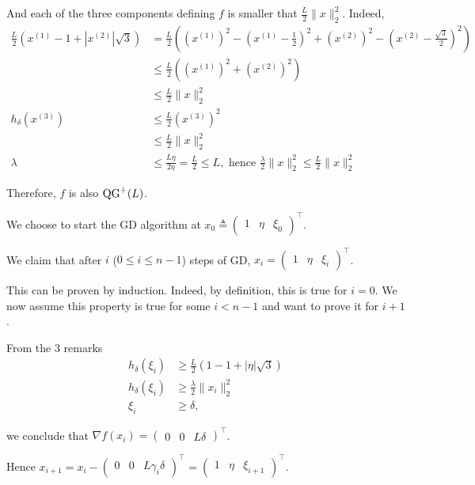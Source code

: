     And each of the three components defining $f$ is smaller that $\frac{L}{2}\|x\|_2^2$. Indeed,
    \begin{align}
        \frac{L}{2}\left(x^{(1)} - 1 + |x^{(2)}|\sqrt{3}\right) & = \frac{L}{2}\left(\left(x^{(1)}\right)^2 - \left(x^{(1)} - \frac{1}{2}\right)^2 + \left(x^{(2)}\right)^2 - \left(x^{(2)} - \frac{\sqrt{3}}{2}\right)^2 \right) \nonumber \\
        & \leq \frac{L}{2} \left( \left(x^{(1)}\right)^2 + \left(x^{(2)}\right)^2 \right) \nonumber \\
        & \leq \frac{L}{2} \|x\|_2^2 \\
        h_{\delta}\left(x^{(3)}\right) & \leq \frac{L}{2}(x^{(3)})^2 \nonumber \\
        & \leq \frac{L}{2}\|x\|_2^2 \\
        \lambda & \leq \frac{L\eta}{2\eta} = \frac{L}{2} \leq L, \text{ hence }
        \frac{\lambda}{2}\|x\|_2^2 \leq \frac{L}{2}\|x\|_2^2
    \end{align}
    
    Therefore, $f$ is also $\operatorname{QG}^+(L)$.
    
    We choose to start the GD algorithm at $x_0 \triangleq \begin{pmatrix} 1 & \eta & \xi_0 \end{pmatrix}^\top$.
    
    We claim that after $i$ ($ 0 \leq i \leq n-1$) steps of GD, $x_i = \begin{pmatrix} 1 & \eta & \xi_i \end{pmatrix}^\top $.
    
    This can be proven by induction.
    Indeed, by definition, this is true for $i=0$.
    We now assume this property is true for some $i < n-1$ and want to prove it for $i+1$.
    
    From the 3 remarks
    \begin{align}
        h_{\delta}(\xi_i) & \geq \frac{L}{2}\left(1 - 1 + |\eta|\sqrt{3}\right) \\
        h_{\delta}(\xi_i) & \geq \frac{\lambda}{2}\|x_i\|_2^2 \\
        \xi_i & \geq \delta,
    \end{align}
    
    we conclude that $\nabla f(x_i) = \begin{pmatrix} 0 & 0 & L\delta \end{pmatrix}^\top$.
    
    Hence $x_{i+1} = x_i - \begin{pmatrix} 0 & 0 & L \gamma_i \delta \end{pmatrix}^\top = \begin{pmatrix} 1 & \eta & \xi_{i+1} \end{pmatrix}^\top$.
    

